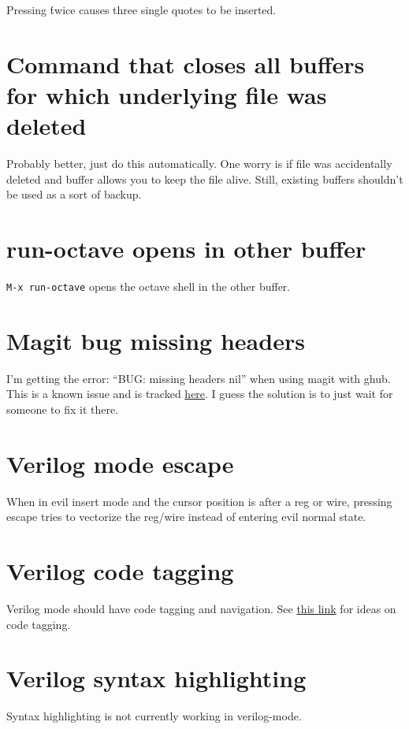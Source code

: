 \documentclass{default}
\begin{document}
Pressing \' twice causes three single quotes to be inserted.

\section{Command that closes all buffers for which underlying file was deleted}

Probably better, just do this automatically. One worry is if file was accidentally deleted and
buffer allows you to keep the file alive. Still, existing buffers shouldn't be used as a sort of
backup.

\section{run-octave opens in other buffer}

\texttt{M-x run-octave} opens the octave shell in the other buffer.

\section{Magit bug missing headers}

I'm getting the error: ``BUG: missing headers nil'' when using magit with ghub. This is a known
issue and is tracked \href{https://github.com/magit/ghub/issues/81}{here}. I guess the solution is
to just wait for someone to fix it there.

\section{Verilog mode escape}

When in evil insert mode and the cursor position is after a reg or wire, pressing escape tries to
vectorize the reg/wire instead of entering evil normal state.

\section{Verilog code tagging}

Verilog mode should have code tagging and navigation. See
\href{https://scripter.co/ctags-systemverilog-and-emacs/}{this link} for ideas on code tagging.

\section{Verilog syntax highlighting}

Syntax highlighting is not currently working in verilog-mode.
\end{document}
